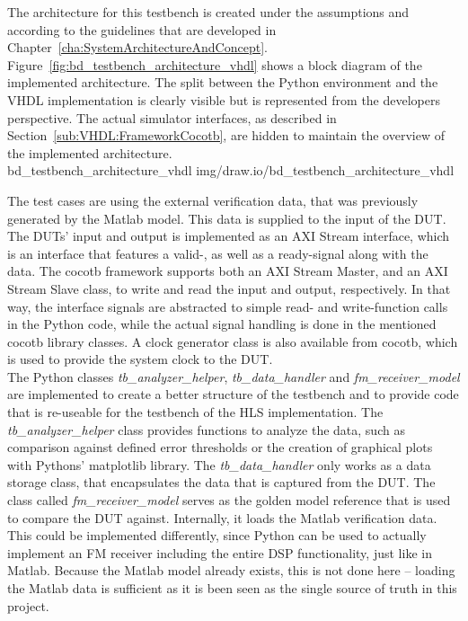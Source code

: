 The architecture for this testbench is created under the assumptions and according to the guidelines that are developed in Chapter~\ref{cha:SystemArchitectureAndConcept}.\\

Figure~\ref{fig:bd_testbench_architecture_vhdl} shows a block diagram of the implemented architecture.
The split between the Python environment and the VHDL implementation is clearly visible but is represented from the developers perspective.
The actual simulator interfaces, as described in Section~\ref{sub:VHDL:FrameworkCocotb}, are hidden to maintain the overview of the implemented architecture.\\

 {bd_testbench_architecture_vhdl} {img/draw.io/bd_testbench_architecture_vhdl}

The test cases are using the external verification data, that was previously generated by the Matlab model.
This data is supplied to the input of the DUT.
The DUTs' input and output is implemented as an AXI Stream interface, which is an interface that features a valid-, as well as a ready-signal along with the data.
The cocotb framework supports both an AXI Stream Master, and an AXI Stream Slave class, to write and read the input and output, respectively.
In that way, the interface signals are abstracted to simple read- and write-function calls in the Python code, while the actual signal handling is done in the mentioned cocotb library classes.
A clock generator class is also available from cocotb, which is used to provide the system clock to the DUT.\\

The Python classes \textit{tb\_analyzer\_helper}, \textit{tb\_data\_handler} and \textit{fm\_receiver\_model} are implemented to create a better structure of the testbench and to provide code that is re-useable for the testbench of the HLS implementation.
The \textit{tb\_analyzer\_helper} class provides functions to analyze the data, such as comparison against defined error thresholds or the creation of graphical plots with Pythons' matplotlib library.
The \textit{tb\_data\_handler} only works as a data storage class, that encapsulates the data that is captured from the DUT.
The class called \textit{fm\_receiver\_model} serves as the golden model reference that is used to compare the DUT against.
Internally, it loads the Matlab verification data.
This could be implemented differently, since Python can be used to actually implement an FM receiver including the entire DSP functionality, just like in Matlab.
Because the Matlab model already exists, this is not done here -- loading the Matlab data is sufficient as it is been seen as the single source of truth in this project.\\

